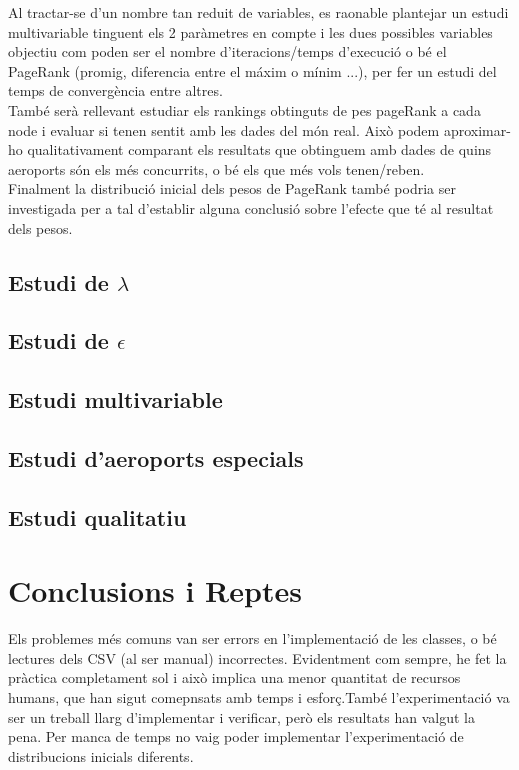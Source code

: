 \documentclass[12pt]{article}
\begin{document}
Al tractar-se d'un nombre tan reduit de variables, es raonable plantejar un estudi multivariable tinguent els 2 paràmetres en compte i les dues possibles variables objectiu com poden ser el nombre d'iteracions/temps d'execució o bé el PageRank (promig, diferencia entre el máxim o mínim ...), per fer un estudi del temps de convergència entre altres.
\\

També serà rellevant estudiar els rankings obtinguts de pes pageRank a cada node i evaluar si tenen sentit amb les dades del món real. Això podem aproximar-ho qualitativament comparant els resultats que obtinguem amb dades de quins aeroports són els més concurrits, o bé els que més vols tenen/reben.
\\ 

Finalment la distribució inicial dels pesos de PageRank també podria ser investigada per a tal d'establir alguna conclusió sobre l'efecte que té al resultat dels pesos.

\subsection{Estudi de $\lambda$}

\subsection{Estudi de $\epsilon$}

\subsection{Estudi multivariable}

\subsection{Estudi d'aeroports especials}

\subsection{Estudi qualitatiu}



\section{Conclusions i Reptes}
Els problemes més comuns van ser errors en l'implementació de les classes, o bé lectures dels CSV (al ser manual) incorrectes. Evidentment com sempre, he fet la pràctica completament sol i això implica una menor quantitat de recursos humans, que han sigut comepnsats amb temps i esforç.També l'experimentació va ser un treball llarg d'implementar i verificar, però els resultats han valgut la pena. Per manca de temps no vaig poder implementar l'experimentació de distribucions inicials diferents.
\\


\end{document}
